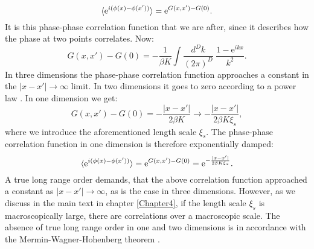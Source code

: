 \begin{equation}
\braket{ \text{e}^{i(\phi(x)- \phi(x'))} } = \text{e}^{G(x,x') - G(0)}. 
\label{eq.phasecorrelationfunction.generaldimension} 
\end{equation}
It is this phase-phase correlation function that we are after, since it describes how the phase at two points correlates. Now:
\begin{equation}
G(x,x') - G(0) = -\frac{1}{\beta K}\int \frac{d^{D}k}{(2\pi)^D}\; \frac{1 - \text{e}^{ikx}}{k^2}. \nonumber
\end{equation}
In three dimensions the phase-phase correlation function approaches a constant in the $|x - x'| \to \infty$ limit. In two dimensions it goes to zero according to a power law \cite[p. 115]{Cardy.StatPhys}. In one dimension we get: 
\begin{equation}
G(x,x') - G(0) = -\frac{|x - x'|}{2\beta K}  \to -\frac{|x - x'|}{2\beta K \xi_s},  
\end{equation}
where we introduce the aforementioned length scale $\xi_s$. The phase-phase correlation function in one dimension is therefore exponentially damped:
\begin{equation}
\braket{ \text{e}^{i(\phi(x)- \phi(x'))} } = \text{e}^{G(x,x') - G(0)} = \text{e}^{-\frac{|x - x'|}{2\beta K \xi_s}}. 
\label{eq.phasecorrelationfunction.onedimension} 
\end{equation}
A true long range order demands, that the above correlation function approached a constant as $|x - x'| \to \infty$, as is the case in three dimensions. However, as we discuss in the main text in chapter \ref{Chapter4}, if the length scale $\xi_s$ is macroscopically large, there are correlations over a macroscopic scale. The absence of true long range order in one and two dimensions is in accordance with the Mermin-Wagner-Hohenberg theorem \cite{Hohenberg.MerminWagnertheorem}. 

